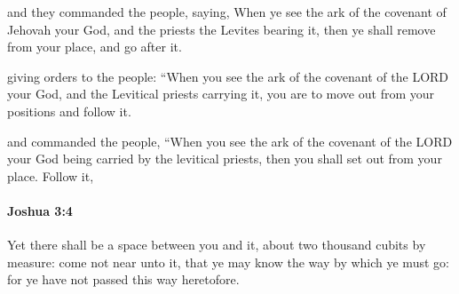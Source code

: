			\begin{versebox}
					\item[BHS] 
					\item[ASV] and they commanded the people, saying, When ye see the ark of the covenant of Jehovah your God, and the priests the Levites bearing it, then ye shall remove from your place, and go after it.
					\item[NIV] giving orders to the people: “When you see the ark of the covenant of the LORD your God, and the Levitical priests carrying it, you are to move out from your positions and follow it.
					\item[NRSV] and commanded the people, “When you see the ark of the covenant of the LORD your God being carried by the levitical priests, then you shall set out from your place. Follow it,
			\end{versebox}

		\paragraph{Joshua 3:4} %
			\label{JOSHUA-3-4}

			Yet there shall be a space between you and it, about two thousand cubits by measure: come not near unto it, that ye may know the way by which ye must go: for ye have not passed this way heretofore.

